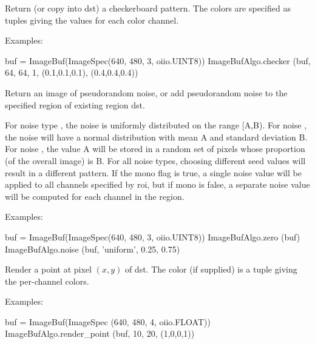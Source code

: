 Return (or copy into {\cf dst}) a checkerboard pattern. The colors are specified as
tuples giving the values for each color channel.

\smallskip
\noindent Examples:
\begin{code}
    buf = ImageBuf(ImageSpec(640, 480, 3, oiio.UINT8))
    ImageBufAlgo.checker (buf, 64, 64, 1, (0.1,0.1,0.1), (0.4,0.4,0.4))
\end{code}
\apiend


 

Return an image of pseudorandom noise, or add pseudorandom noise
to the specified region of existing region {\cf dst}.

For noise type , the noise is uniformly distributed on the
range {\cf [A,B)}. For noise , the noise will have a normal
distribution with mean A and standard deviation B. For noise , the
value A will be stored in a random set of pixels whose proportion (of the
overall image) is B. For all noise types, choosing different {\cf seed}
values will result in a different pattern. If the {\cf mono} flag is {\cf
true}, a single noise value will be applied to all channels specified by
{\cf roi}, but if {\cf mono} is {\cf false}, a separate noise value will be
computed for each channel in the region.

\smallskip
\noindent Examples:
\begin{code}
    buf = ImageBuf(ImageSpec(640, 480, 3, oiio.UINT8))
    ImageBufAlgo.zero (buf)
    ImageBufAlgo.noise (buf, 'uniform', 0.25, 0.75)
\end{code}
\apiend



 

Render a point at pixel $(x,y)$ of {\cf dst}.  The {\cf color} (if supplied)
is a tuple giving the per-channel colors.

\smallskip
\noindent Examples:
\begin{code}
    buf = ImageBuf(ImageSpec (640, 480, 4, oiio.FLOAT))
    ImageBufAlgo.render_point (buf, 10, 20, (1,0,0,1))
\end{code}
\apiend



